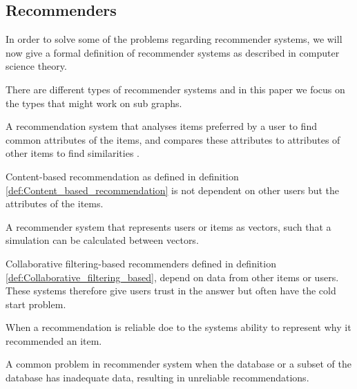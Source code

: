 \subsection{Recommenders}
In order to solve some of the problems regarding recommender systems, we will now give a formal definition of recommender systems as described in computer science theory. 

There are different types of recommender systems and in this paper we focus on the types that might work on sub graphs.

\begin{definition} \label{def:Content_based_recommendation}
A recommendation system that analyses items preferred by a user to find common attributes of the items, and compares these attributes to attributes of other items to find similarities \cite{lu2015recommender}. 
\end{definition}

Content-based recommendation as defined in definition  \autoref{def:Content_based_recommendation} is not dependent on other users but the attributes of the items.

\begin{definition}\label{def:Collaborative_filtering_based}
A recommender system that represents users or items as vectors, such that a simulation can be calculated between vectors\cite{lu2015recommender}.
\end{definition}

Collaborative filtering-based recommenders defined in definition \autoref{def:Collaborative_filtering_based}, depend on data from other items or users. These systems therefore give users trust in the answer but often have the cold start problem.

\begin{definition}[Trust]\label{def:trust}
When a recommendation is reliable doe to the systems ability to represent why it recommended an item\cite{Ricci2015}.
\end{definition}

\begin{definition}\label{def:cold_start_problem}
A common problem in recommender system when the database or a subset of the database has inadequate data, resulting in unreliable recommendations\cite{Ricci2015}.
\end{definition}
